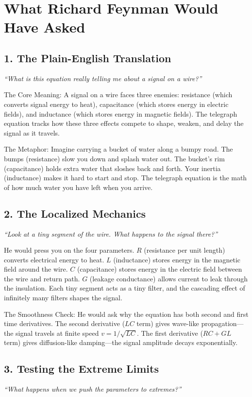 \section*{What Richard Feynman Would Have Asked}

\subsection*{1. The Plain-English Translation}
\textit{``What is this equation really telling me about a signal on a wire?''}

The Core Meaning: A signal on a wire faces three enemies: resistance (which converts signal energy to heat), capacitance (which stores energy in electric fields), and inductance (which stores energy in magnetic fields). The telegraph equation tracks how these three effects compete to shape, weaken, and delay the signal as it travels.

The Metaphor: Imagine carrying a bucket of water along a bumpy road. The bumps (resistance) slow you down and splash water out. The bucket's rim (capacitance) holds extra water that sloshes back and forth. Your inertia (inductance) makes it hard to start and stop. The telegraph equation is the math of how much water you have left when you arrive.

\subsection*{2. The Localized Mechanics}
\textit{``Look at a tiny segment of the wire. What happens to the signal there?''}

He would press you on the four parameters. $R$ (resistance per unit length) converts electrical energy to heat. $L$ (inductance) stores energy in the magnetic field around the wire. $C$ (capacitance) stores energy in the electric field between the wire and return path. $G$ (leakage conductance) allows current to leak through the insulation. Each tiny segment acts as a tiny filter, and the cascading effect of infinitely many filters shapes the signal.

The Smoothness Check: He would ask why the equation has both second and first time derivatives. The second derivative ($LC$ term) gives wave-like propagation---the signal travels at finite speed $v = 1/\sqrt{LC}$. The first derivative ($RC + GL$ term) gives diffusion-like damping---the signal amplitude decays exponentially.

\subsection*{3. Testing the Extreme Limits}
\textit{``What happens when we push the parameters to extremes?''}

